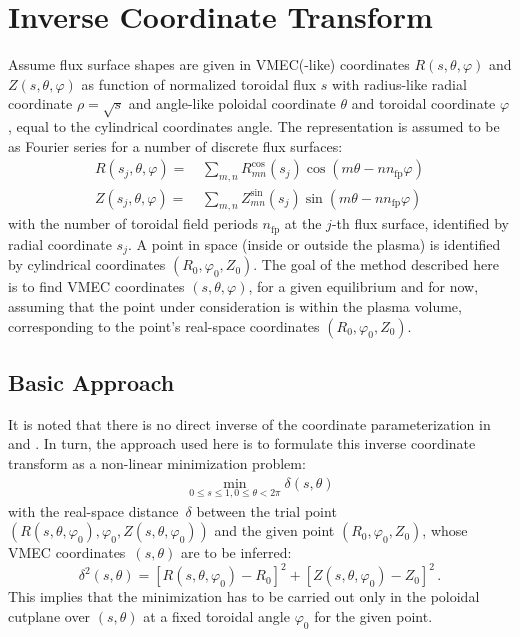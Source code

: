 \section{Inverse Coordinate Transform}
%
Assume flux surface shapes are given in VMEC(-like) coordinates $R(s, \theta, \varphi)$ and $Z(s, \theta, \varphi)$
as function of normalized toroidal flux $s$ with radius-like radial coordinate $\rho = \sqrt{s}$
and angle-like poloidal coordinate $\theta$ and toroidal coordinate $\varphi$,
equal to the cylindrical coordinates angle.
%
The representation is assumed to be as Fourier series for a number of discrete flux surfaces:
\begin{align}
 R(s_j, \theta, \varphi) =&\, \sum_{m,n} R^\textrm{cos}_{mn}(s_j) \cos(m \theta - n n_\textrm{fp} \varphi) \label{eqn:r_of_flux_coords} \\
 Z(s_j, \theta, \varphi) =&\, \sum_{m,n} Z^\textrm{sin}_{mn}(s_j) \sin(m \theta - n n_\textrm{fp} \varphi) \label{eqn:z_of_flux_coords}
\end{align}
with the number of toroidal field periods $n_\textrm{fp}$
at the $j$-th flux surface, identified by radial coordinate $s_j$.
%
A point in space (inside or outside the plasma) is identified by cylindrical coordinates $(R_0, \varphi_0, Z_0)$.
%
The goal of the method described here is to find VMEC coordinates $(s, \theta, \varphi)$,
for a given equilibrium and for now, assuming that the point under consideration is within the plasma volume,
corresponding to the point's real-space coordinates $(R_0, \varphi_0, Z_0)$.

\FloatBarrier
\subsection{Basic Approach}
%
It is noted that there is no direct inverse of the coordinate parameterization
in  and .
%
In turn, the approach used here is to formulate this inverse coordinate transform as a non-linear minimization problem:
\begin{align}
 \min_{0 \leq s \leq 1, 0 \leq \theta < 2 \pi} \delta(s, \theta)
\end{align}
with the real-space distance~$\delta$ between the trial point $(R(s, \theta, \varphi_0), \varphi_0, Z(s, \theta, \varphi_0))$
and the given point $(R_0, \varphi_0, Z_0)$, whose VMEC coordinates~$(s, \theta)$ are to be inferred:
\begin{equation}
 \delta^2 (s, \theta) = \left[ R(s, \theta, \varphi_0) - R_0 \right]^2 + \left[ Z(s, \theta, \varphi_0) - Z_0 \right]^2 \, .
\end{equation}
%
This implies that the minimization has to be carried out only in the poloidal cutplane over $(s, \theta)$
at a fixed toroidal angle $\varphi_0$ for the given point.

